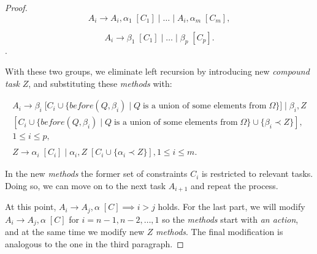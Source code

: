 \begin{proof}
    \[
        A_i \rightarrow A_i, \alpha_1 \; [C_1] \; | \; \dots \; | \; A_i, \alpha_m \; [C_m],
    \]

    \[
        A_i \rightarrow \beta_1 \; [C_1] \; | \; \dots \; | \; \beta_p \; [C_p].
    \].

    With these two groups, we eliminate left recursion by introducing new \emph{compound task} $Z$, and substituting these \emph{methods} with:

    \begin{gather*}
        A_i \rightarrow \beta_i \; [C_i \cup \{before(Q, \beta_i) \; | \; Q \; \text{is a union of some elements from} \;\Omega\}] \; | \; \beta_i, Z \\ [C_i \cup \{before(Q, \beta_i) \; | \; Q \; \text{is a union of some elements from} \;\Omega \} \cup \{\beta_i \prec Z\}], \\ 1 \leq i \leq  p, \\ \\
        Z \rightarrow \alpha_i \; [C_i] \; | \; \alpha_i, Z \; [C_i \cup \{\alpha_i \prec Z\}], 1 \leq i \leq m.
    \end{gather*}

    In the new \emph{methods} the former set of constraints $C_i$ is restricted to relevant tasks. Doing so, we can move on to the next task $A_{i + 1}$ and repeat the process.

    At this point, $A_i \rightarrow A_j, \alpha \; [C] \implies i > j$ holds. For the last part, we will modify $A_i \rightarrow A_j, \alpha \; [C]$ for $i = n - 1, n - 2, \dots, 1$ so the \emph{methods} start with \emph{an action}, and at the same time we modify new $Z$ \emph{methods}. The final modification is analogous to the one in the third paragraph.
\end{proof}




